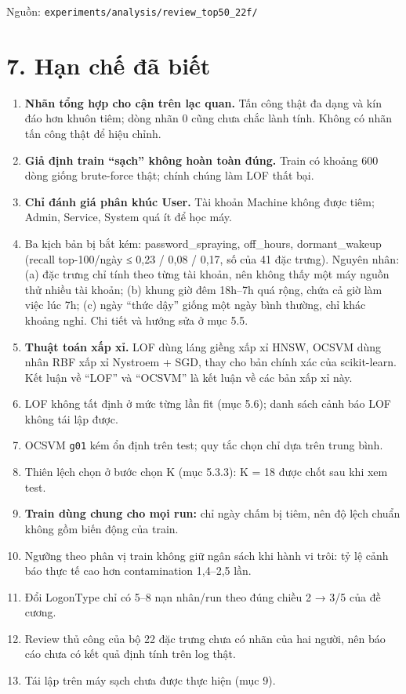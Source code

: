 \documentclass[
  11pt,
]{article}
\providecommand{\tightlist}{%
  \setlength{\itemsep}{0pt}\setlength{\parskip}{0pt}}
\begin{document}
Nguồn:
\texttt{experiments/\allowbreak{}analysis/\allowbreak{}review\_\allowbreak{}top50\_\allowbreak{}22f/\allowbreak{}}

\hypertarget{hux1ea1n-chux1ebf-ux111uxe3-biux1ebft}{%
\section{7. Hạn chế đã
biết}\label{hux1ea1n-chux1ebf-ux111uxe3-biux1ebft}}

\begin{enumerate}
\def\labelenumi{\arabic{enumi}.}
\tightlist
\item
  \textbf{Nhãn tổng hợp cho cận trên lạc quan.} Tấn công thật đa dạng và
  kín đáo hơn khuôn tiêm; dòng nhãn 0 cũng chưa chắc lành tính. Không có
  nhãn tấn công thật để hiệu chỉnh.
\item
  \textbf{Giả định train ``sạch'' không hoàn toàn đúng.} Train có khoảng
  600 dòng giống brute-force thật; chính chúng làm LOF thất bại.
\item
  \textbf{Chỉ đánh giá phân khúc User.} Tài khoản Machine không được
  tiêm; Admin, Service, System quá ít để học máy.
\item
  Ba kịch bản bị bắt kém: password\_\allowbreak{}spraying,
  off\_\allowbreak{}hours, dormant\_\allowbreak{}wakeup (recall
  top-100/ngày ≤ 0,23 / 0,08 / 0,17, số của 41 đặc trưng). Nguyên nhân:
  (a) đặc trưng chỉ tính theo từng tài khoản, nên không thấy một máy
  nguồn thử nhiều tài khoản; (b) khung giờ đêm 18h--7h quá rộng, chứa cả
  giờ làm việc lúc 7h; (c) ngày ``thức dậy'' giống một ngày bình thường,
  chỉ khác khoảng nghỉ. Chi tiết và hướng sửa ở mục 5.5.
\item
  \textbf{Thuật toán xấp xỉ.} LOF dùng láng giềng xấp xỉ HNSW, OCSVM
  dùng nhân RBF xấp xỉ Nystroem + SGD, thay cho bản chính xác của
  scikit-learn. Kết luận về ``LOF'' và ``OCSVM'' là kết luận về các bản
  xấp xỉ này.
\item
  LOF không tất định ở mức từng lần fit (mục 5.6); danh sách cảnh báo
  LOF không tái lập được.
\item
  OCSVM \texttt{g01} kém ổn định trên test; quy tắc chọn chỉ dựa trên
  trung bình.
\item
  Thiên lệch chọn ở bước chọn K (mục 5.3.3): K = 18 được chốt sau khi
  xem test.
\item
  \textbf{Train dùng chung cho mọi run:} chỉ ngày chấm bị tiêm, nên độ
  lệch chuẩn không gồm biến động của train.
\item
  Ngưỡng theo phân vị train không giữ ngân sách khi hành vi trôi: tỷ lệ
  cảnh báo thực tế cao hơn contamination 1,4--2,5 lần.
\item
  Đổi LogonType chỉ có 5--8 nạn nhân/run theo đúng chiều 2 → 3/5 của đề
  cương.
\item
  Review thủ công của bộ 22 đặc trưng chưa có nhãn của hai người, nên
  báo cáo chưa có kết quả định tính trên log thật.
\item
  Tái lập trên máy sạch chưa được thực hiện (mục 9).
\end{enumerate}
\end{document}
